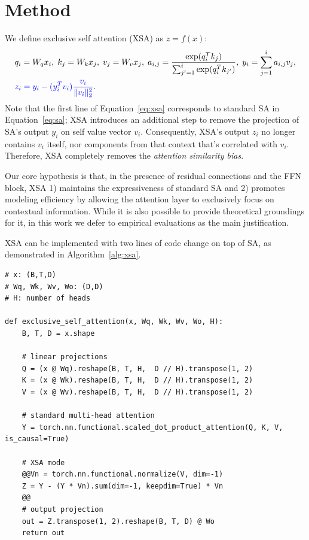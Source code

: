 \documentclass{article}
\begin{document}
\section{Method}
We define exclusive self attention (XSA) as $z = f(x)$:
\begin{equation}
\label{eq:xsa}
    \begin{split}
        &q_i = W_q x_i,\;
        k_j = W_k x_j,\;
        v_j = W_v x_j, \; 
        a_{i,j} = \frac{\exp(q_i^Tk_j)}{\sum_{j'=1}^{i}\exp(q_i^Tk_{j'})},\;
        y_i = \sum_{j=1}^i a_{i,j}v_j,\\
        &\textcolor{blue}{z_i = y_i - (y_i^Tv_i)\frac{v_i}{\|v_i\|^2_2}}. \;
    \end{split}
\end{equation}
Note that the first line of Equation~\ref{eq:xsa} corresponds to standard SA in Equation~\ref{eq:sa}; XSA introduces an additional step to remove the projection of SA's output $y_i$ on self value vector $v_i$. Consequently, XSA's output $z_i$ no longer contains $v_i$ itself, nor components from that context that's correlated with $v_i$. Therefore, XSA completely removes the \textit{attention similarity bias}.

Our core hypothesis is that, in the presence of residual connections and the FFN block, XSA 1) maintains the expressiveness of standard SA and 2) promotes modeling efficiency by allowing the attention layer to exclusively focus on contextual information. While it is also possible to provide theoretical groundings for it, in this work we defer to empirical evaluations as the main justification.

XSA can be implemented with two lines of code change on top of SA, as demonstrated in Algorithm~\ref{alg:xsa}.


\begin{algorithm}[t]
\caption{PyTorch-style pseudocode for multi-head causal XSA}
\label{alg:xsa}
\small
\begin{lstlisting}[style=ptpseudo]
# x: (B,T,D)
# Wq, Wk, Wv, Wo: (D,D)
# H: number of heads

def exclusive_self_attention(x, Wq, Wk, Wv, Wo, H):
    B, T, D = x.shape

    # linear projections
    Q = (x @ Wq).reshape(B, T, H,  D // H).transpose(1, 2)
    K = (x @ Wk).reshape(B, T, H,  D // H).transpose(1, 2)
    V = (x @ Wv).reshape(B, T, H,  D // H).transpose(1, 2)

    # standard multi-head attention
    Y = torch.nn.functional.scaled_dot_product_attention(Q, K, V, is_causal=True)

    # XSA mode
    @@Vn = torch.nn.functional.normalize(V, dim=-1)
    Z = Y - (Y * Vn).sum(dim=-1, keepdim=True) * Vn
    @@
    # output projection
    out = Z.transpose(1, 2).reshape(B, T, D) @ Wo
    return out
\end{lstlisting}
\end{algorithm}
\end{document}
